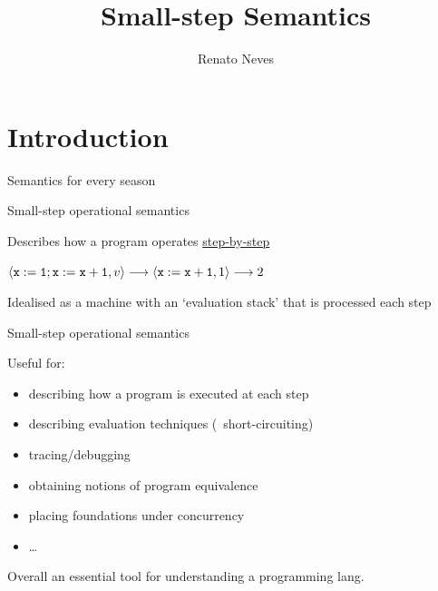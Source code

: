 \documentclass{beamer}
\author[Renato Neves]{Renato Neves}
\date{}
\begin{document}
\title{Small-step Semantics}

\frame[plain]{\titlepage}

\section{Introduction}

\begin{frame}{Semantics for every season}

        \hspace*{+5pt}

\end{frame}


\begin{frame}{Small-step operational semantics}

        Describes \alert{how} a program operates \alert{\underline{step-by-step}}

        \begin{example}
                $\langle \mathtt{x := 1 ; x := x +1}, v \rangle \longrightarrow
                \langle \mathtt{x := x + 1}, 1 \rangle \longrightarrow 2$
        \end{example}

        \bigskip
        Idealised as a machine with an `evaluation stack' that is processed each step
\end{frame}

\begin{frame}{Small-step operational semantics}

        Useful for:
        \begin{itemize}
                \item describing how a program is executed at each step
                \item describing evaluation techniques (\eg\ short-circuiting)
                \item tracing/debugging
                \item obtaining notions of program equivalence
                \item placing foundations under concurrency
                \item \dots
        \end{itemize}

        \vfill 
        \pause
        Overall an essential tool for understanding a programming lang.

\end{frame}
\end{document}
